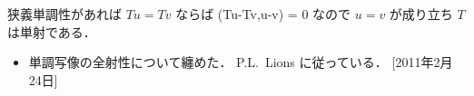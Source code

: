 狭義単調性があれば $Tu=Tv$ ならば
\bdm %
(Tu-Tv,u-v) = 0
\edm %
なので $u=v$ が成り立ち $T$ は単射である．
\QED %

\begin{itemize}
\item 単調写像の全射性について纏めた．
P.L.~Lions \cite{Lions69} に従っている．
[2011年2月24日]
\end{itemize}

